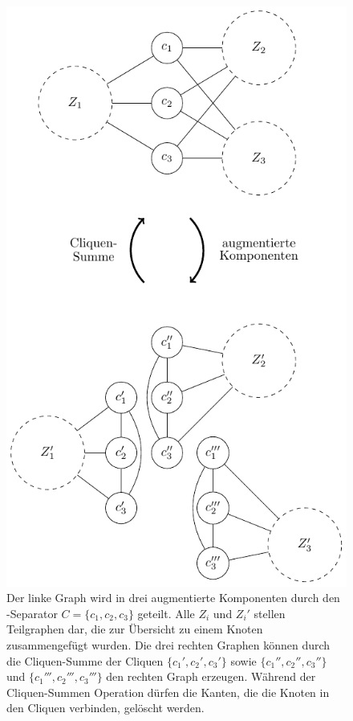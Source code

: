 \begin{figure}[H]
  \centering
  \includegraphics[keepaspectratio]{bilder/Augmentierte_Komponenten.pdf}
  \caption{Der linke Graph wird in drei augmentierte Komponenten durch den \dd-Separator $C = \{c_1, c_2, c_3\}$ geteilt.
           Alle $Z_i$ und $Z_i'$ stellen Teilgraphen dar, die zur Übersicht zu einem Knoten zusammengefügt wurden.
           Die drei rechten Graphen können durch die Cliquen-Summe der Cliquen $\{c_1', c_2', c_3'\}$ sowie $\{c_1'', c_2'', c_3''\}$ und $\{c_1''', c_2''', c_3'''\}$ den rechten Graph erzeugen.
           Während der Cliquen-Summen Operation dürfen die Kanten, die die Knoten in den Cliquen verbinden, gelöscht werden.}
  \label{fig:AugmentierteKomponenten}
\end{figure}

